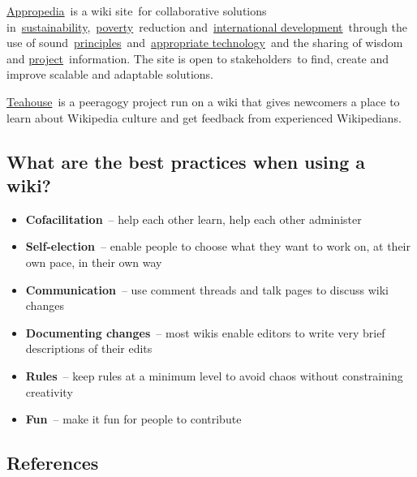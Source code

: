 \href{http://www.appropedia.org/Welcome_to_Appropedia}{Appropedia}~is a
wiki site~for collaborative solutions
in~\href{http://www.appropedia.org/Sustainability}{sustainability},~\href{http://www.appropedia.org/Poverty}{poverty}~reduction
and~\href{http://www.appropedia.org/International_development}{international
development}~through the use of
sound~\href{http://www.appropedia.org/Principles}{principles}~and~\href{http://www.appropedia.org/Appropriate_technology}{appropriate
technology}~and the sharing of wisdom and
\href{http://www.appropedia.org/Project}{project}~information. The site
is open to stakeholders~to find, create and improve scalable and
adaptable solutions.

\href{http://en.wikipedia.org/wiki/Wikipedia:Teahouse}{Teahouse}~is a
peeragogy project run on a wiki that gives newcomers a place to learn
about Wikipedia culture and get feedback from experienced Wikipedians.

\hypertarget{what-are-the-best-practices-when-using-a-wiki}{%
\subsection{What are the best practices when using a
wiki?}\label{what-are-the-best-practices-when-using-a-wiki}}

\begin{itemize}
\tightlist
\item
  \textbf{Cofacilitation}~-- help each other learn, help each other
  administer
\item
  \textbf{Self-election}~-- enable people to choose what they want to
  work on, at their own pace, in their own way
\item
  \textbf{Communication}~-- use comment threads and talk pages to
  discuss wiki changes
\item
  \textbf{Documenting changes}~-- most wikis enable editors to write
  very brief descriptions of their edits
\item
  \textbf{Rules}~-- keep rules at a minimum level to avoid chaos without
  constraining creativity
\item
  \textbf{Fun}~-- make it fun for people to contribute
\end{itemize}

\hypertarget{references}{%
\subsection{References}\label{references}}

